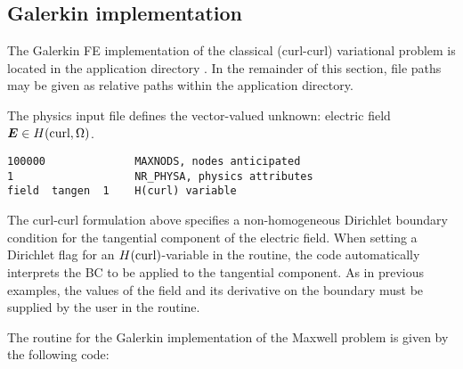 \subsection{Galerkin implementation}
\label{subsec:maxwell-galerkin}

The Galerkin FE implementation of the classical (curl-curl) variational problem is located in the application directory . In the remainder of this section, file paths may be given as relative paths within the application directory.

The physics input file defines the vector-valued unknown: electric field $\boldsymbol E \in H(\text{curl}, \Omega)$.
\begin{lstlisting}[caption=\file{MAXWELL/GALERKIN/input/physics} input file.]
100000              MAXNODS, nodes anticipated
1                   NR_PHYSA, physics attributes
field  tangen  1    H(curl) variable
\end{lstlisting}

The curl-curl formulation above specifies a non-homogeneous Dirichlet boundary condition for the tangential component of the electric field. When setting a Dirichlet flag for an $H(\text{curl})$-variable in the  routine, the code automatically interprets the BC to be applied to the tangential component. As in previous examples, the values of the field and its derivative on the boundary must be supplied by the user in the  routine.

The  routine for the Galerkin implementation of the Maxwell problem is given by the following code:

